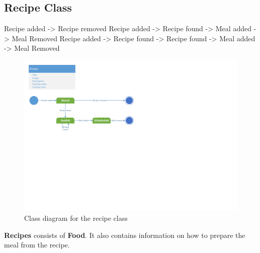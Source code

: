 \subsection{Recipe Class}

Recipe added -> Recipe removed
Recipe added -> Recipe found -> Meal added -> Meal Removed
Recipe added -> Recipe found -> Recipe found -> Meal added -> Meal Removed

\begin{figure}[H]
	\centering
	\includegraphics[clip=true, trim=0.5cm 11cm 14cm 0.5cm]{Development/ProblemDomain/RecipeClass.pdf}
	\caption{Class diagram for the recipe class} \label{RecipeClass}
	\end{figure}
\textbf{Recipes} consists of \textbf{Food}. It also contains information on how to prepare the meal from the recipe.